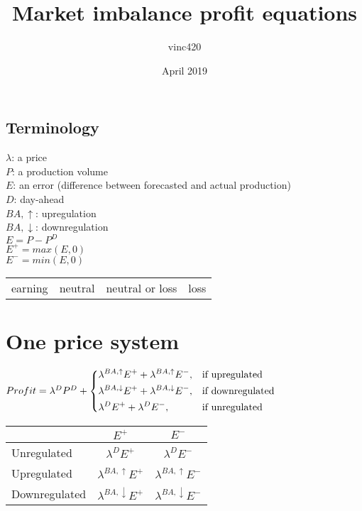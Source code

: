 \documentclass{article}
\title{Market imbalance profit equations}
\author{vinc420 }
\date{April 2019}
\begin{document}
\maketitle
\newpage
\subsection*{Terminology}
$\lambda$: a price \\
$P$: a production volume \\
$E$: an error (difference between forecasted and actual production) \\
$D$: day-ahead \\
$BA,\uparrow$: upregulation \\
$BA,\downarrow$: downregulation \\
$E = P - P^{D}$ \\
$E^{+} = max(E,0)$ \\
$E^{-} = min(E,0)$ \\

\begin{tabular}{ |C|C|C|C|  }
\hline
{}earning &
neutral &
neutral or loss &
loss

\end{tabular}

\section*{One price system}

\begin{math}
    Profit = \lambda^{D}P^{D} +
    \begin{dcases}
    \lambda^{BA,\uparrow}E^{+}+\lambda^{BA,\uparrow}E^{-}, & \mbox{if upregulated} \\ \lambda^{BA,\downarrow}E^{+}+\lambda^{BA,\downarrow}E^{-}, & \mbox{if downregulated} \\ \lambda^{D}E^{+}+\lambda^{D}E^{-}, & \mbox{if unregulated}
    \end{dcases}
\end{math}
\\
\newline

\begin{tabular}{ |s|c|c|  }
\hline
{} & $E^{+}$ &  $E^{-}$ \\
\hline
{} Unregulated & $\lambda^{D}E^{+}$ & $\lambda^{D}E^{-}$ \\
 Upregulated & $\lambda^{BA,\uparrow}E^{+}$ & $\lambda^{BA,\uparrow}E^{-}$ \\
 Downregulated & $\lambda^{BA,\downarrow}E^{+}$ & $\lambda^{BA,\downarrow}E^{-}$ \\
\hline
\end{tabular}
\end{document}
